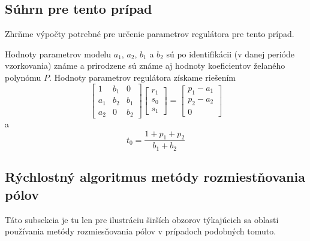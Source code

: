 \documentclass[a4paper, 10pt, ]{article}
\begin{document}
\subsection{Súhrn pre tento prípad}

Zhrňme výpočty potrebné pre určenie parametrov regulátora pre tento prípad.

Hodnoty parametrov modelu $a_1$, $a_2$, $b_1$ a $b_2$ sú po identifikácii (v danej perióde vzorkovania) známe a prirodzene sú známe aj hodnoty koeficientov želaného polynómu $P$. Hodnoty parametrov regulátora získame riešením
\begin{equation}
	\begin{bmatrix} 1 & b_1 & 0 \\ a_1 & b_2 & b_1 \\ a_2 &   0 & b_2 \end{bmatrix}
	\begin{bmatrix} r_1 \\ s_0 \\ s_1  \end{bmatrix}
	=
	\begin{bmatrix} p_1 - a_1 \\ p_2 - a_2 \\ 0 \end{bmatrix}
\end{equation}
a
\begin{equation}
		t_0 = \frac{1 + p_1 + p_2}{b_1 + b_2}
\end{equation}
















\subsection{Rýchlostný algoritmus metódy rozmiestňovania pólov}

Táto subsekcia je tu len pre ilustráciu širších obzorov týkajúcich sa oblasti používania metódy rozmiesňovania pólov v prípadoch podobných tomuto.

\bigskip
\end{document}
